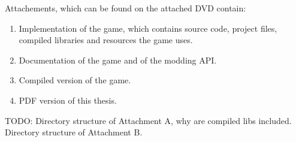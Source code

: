 \documentclass[12pt,a4paper]{report}
\let\openright=\clearpage
\begin{document}



\tableofcontents












Attachements, which can be found on the attached DVD contain:

\begin{enumerate}[label=\textbf{\Alph*.}]
    \item Implementation of the game, which contains source code, project files,
        compiled libraries and resources the game uses.
    \item Documentation of the game and of the modding API.
    \item Compiled version of the game.
    \item PDF version of this thesis.
\end{enumerate}

\bigskip
TODO: Directory structure of Attachment A, why are compiled libs included. Directory structure of Attachment B.

\openright
\end{document}
